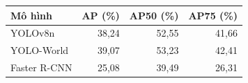 \begin{tabular}{lrrr}
\toprule
Mô hình & AP (\%) & AP50 (\%) & AP75 (\%) \\
\midrule
YOLOv8n & 38{,}24 & 52{,}55 & 41{,}66 \\
YOLO-World & 39{,}07 & 53{,}23 & 42{,}41 \\
Faster R-CNN & 25{,}08 & 39{,}49 & 26{,}31 \\
\bottomrule
\end{tabular}
